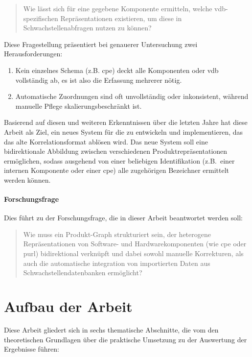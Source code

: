 \begin{quote}
    Wie lässt sich für eine gegebene Komponente ermitteln, welche \acrshort{vdb}-spezifischen Repräsentationen existieren, um diese in Schwachstellenabfragen nutzen zu können?
\end{quote}

Diese Fragestellung präsentiert bei genauerer Untersuchung zwei Herausforderungen:

\begin{enumerate}
    \item Kein einzelnes Schema (z.B. \acrshort{cpe}) deckt alle Komponenten oder \acrshort{vdb} vollständig ab, es ist also die Erfassung mehrerer nötig.
    \item Automatische Zuordnungen sind oft unvollständig oder inkonsistent, während manuelle Pflege skalierungsbeschränkt ist.
\end{enumerate}

Basierend auf diesen und weiteren Erkenntnissen über die letzten Jahre hat diese Arbeit als Ziel, ein neues System für die \metaeffekt zu entwickeln und implementieren, das das alte Korrelationsformat ablösen wird.
Das neue System soll eine bidirektionale Abbildung zwischen verschiedenen Produktrepräsentationen ermöglichen, sodass ausgehend von einer beliebigen Identifikation (z.B.\ einer internen Komponente oder einer \acrshort{cpe}) alle zugehörigen Bezeichner ermittelt werden können.

\paragraph{Forschungsfrage}

Dies führt zu der Forschungsfrage, die in dieser Arbeit beantwortet werden soll:

\begin{quote}
    Wie muss ein Produkt-Graph strukturiert sein, der heterogene Repräsentationen von Software- und Hardwarekomponenten (wie \acrshort{cpe} oder \acrshort{purl}) bidirektional verknüpft und
    dabei sowohl manuelle Korrekturen, als auch die automatische integration von importierten Daten aus Schwachstellendatenbanken ermöglicht?
\end{quote}


\section{Aufbau der Arbeit}\label{sec:arbeit-aufbau}

Diese Arbeit gliedert sich in sechs thematische Abschnitte, die vom den theoretischen Grundlagen über die praktische Umsetzung zu der Auswertung der Ergebnisse führen:

